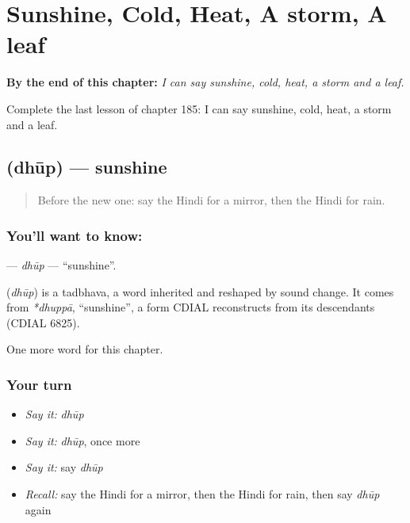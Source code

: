 
\chapter{Sunshine, Cold, Heat, A storm, A leaf}
\label{ch:hi-sunshine-cold-heat-a-storm-a-leaf}

\begin{chapteropening}
\textbf{By the end of this chapter:} \emph{I can say sunshine, cold, heat, a storm and a leaf.}

Complete the last lesson of chapter 185: I can say sunshine, cold, heat, a storm and a leaf.
\end{chapteropening}

\section[\texorpdfstring{\hi{धूप} (dhūp)}{धूप (dhūp)}]{ (dhūp) — sunshine}

\label{lesson:HI-C185-dhup}



\begin{quote}
Before the new one: say the Hindi for a mirror, then the Hindi for rain.
\end{quote}

\subsection*{You'll want to know: }
\textbf{} — \emph{dhūp} — \textquotedblleft{}sunshine\textquotedblright{}.

\begin{cousinweb}
\textbf{} (\emph{dhūp}) is a tadbhava, a word inherited and reshaped by sound change. It comes from \emph{*dhuppā}, \textquotedblleft{}sunshine\textquotedblright{}, a form CDIAL reconstructs from its descendants (CDIAL 6825).
\end{cousinweb}

\begin{grammarlens}[title={What you've built}]
One more word for this chapter.
\end{grammarlens}

\subsection*{Your turn}
\begin{itemize}
\raggedright
  \item \emph{Say it:} \emph{dhūp}
  \item \emph{Say it:} \emph{dhūp}, once more
  \item \emph{Say it:} say \emph{dhūp}
  \item \emph{Recall:} say the Hindi for a mirror, then the Hindi for rain, then say \emph{dhūp} again
\end{itemize}

